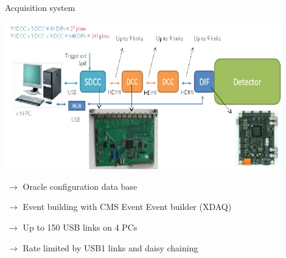 \documentclass[10pt]{beamer}
\begin{document}
\begin{frame}{Acquisition system}
  \centerline{\includegraphics[width=0.9\textwidth,height=0.45\textheight]{jpg/DAQLinks}}
  \begin{block}
    {\small 
      \par $ ~\rightarrow$  Oracle configuration data base
      \par $ ~\rightarrow$  Event building with CMS Event Event builder (XDAQ)
      \par $ ~ \rightarrow$ Up to 150 USB links on 4 PCs
      \par $ ~\rightarrow$  Rate limited by USB1 links and daisy chaining 


    }
  \end{block}
\end{frame}
\end{document}
